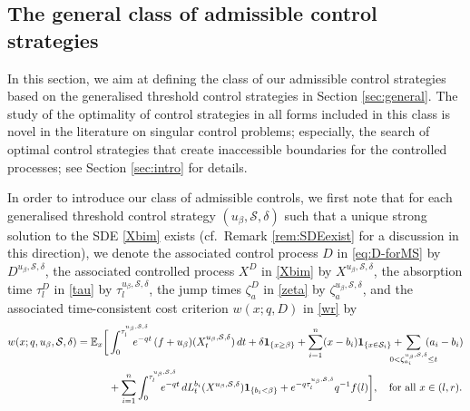\documentclass[11pt]{article} %
\numberwithin{komcounter}{section}
\begin{document}
\subsection{The general class of admissible control strategies}
\label{sec:mixed}
In this section, we aim at defining the class of our admissible control strategies based on the generalised threshold control strategies in Section \ref{sec:general}. 
The study of the optimality of control strategies in all forms included in this class is novel in the literature on singular control problems; especially, the search of optimal control strategies that create inaccessible boundaries for the controlled processes; see Section \ref{sec:intro} for details. 

In order to introduce our class of admissible controls, we first note that for each generalised threshold control strategy $(u_\beta,\mathcal{S},\delta)$ such that a unique strong solution to the SDE \eqref{Xbim} exists (cf.~Remark \ref{rem:SDEexist} for a discussion in this direction), we denote 
the associated control process $D$ in \eqref{eq:D-forMS} by $D^{u_\beta,\mathcal{S},\delta}$, 
the associated controlled process $X^D$ in \eqref{Xbim} by $X^{u_\beta,\mathcal{S},\delta}$, the absorption time $\tau^D_l$ in \eqref{tau} by $\tau^{u_\beta,\mathcal{S},\delta}_l$, 
the jump times $\zeta^D_a$ in \eqref{zeta} by $\zeta^{u_\beta,\mathcal{S},\delta}_a$, 
and the associated time-consistent cost criterion $w(x;q,D)$ in \eqref{wr} by 
\begin{align} \label{wrd} 
\begin{split}
w(x;q,u_\beta,\mathcal{S},\delta) = \mathbb{E}_x\bigg[ &\int_0^{\tau^{u_\beta,\mathcal{S},\delta}_l} \hspace{-6mm} e^{-q t} \, (f+u_\beta)(X^{u_\beta,\mathcal{S},\delta}_t)\, dt + \delta \mathbf{1}_{\{x \geq \beta\}} + \sum_{i=1}^{n} (x-b_i) \mathbf{1}_{\{x \in \mathcal{S}_i\}} 
+ \hspace{-5mm}\sum_{0 <\zeta^{u_\beta,\mathcal{S},\delta}_{a_i} \leq t} \hspace{-4mm}(a_i - b_i) \\
&+ \sum_{i=1}^{n} \int_0^{\tau^{u_\beta,\mathcal{S},\delta}_l} \hspace{-6mm} e^{-q t} \, d L^{b_i}_t(X^{u_\beta,\mathcal{S},\delta}) \mathbf{1}_{\{b_i < \beta\}} + e^{-q \tau^{u_\beta,\mathcal{S},\delta}_l} q^{-1}f(l) \bigg], \quad \text{for all } x\in(l,r).
\end{split}
\end{align}
\end{document}
